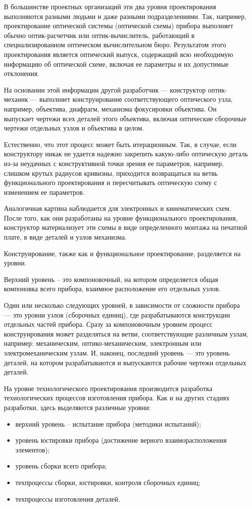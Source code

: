 В большинстве проектных организаций эти два уровня проектирования выполняются разными людьми и даже разными подразделениями. 
Так, например, проектирование оптической системы (оптической схемы) прибора выполняет обычно оптик-расчетчик или оптик-вычислитель, работающий в специализированном оптическом вычислительном бюро. 
Результатом этого проектирования является оптический выпуск, содержащий всю необходимую информацию об оптической схеме, включая ее параметры и их допустимые отклонения. 

На основании этой информации другой разработчик --- конструктор оптик-механик --- выполняет конструирование соответствующего оптического узла, например, объектива, диафрагм, механизма фокусировки объектива. 
Он выпускает чертежи всех деталей этого объектива, включая оптические сборочные чертежи отдельных узлов и объектива в целом.

Естественно, что этот процесс может быть итерационным. 
Так, в случае, если конструктору никак не удается надежно закрепить какую-либо оптическую деталь из-за неудачных с конструктивной точки зрения ее параметров, например, слишком крутых радиусов кривизны, приходится возвращаться на ветвь функционального проектирования и пересчитывать оптическую схему с изменением ее параметров.

Аналогичная картина наблюдается для электронных и кинематических схем. 
После того, как они разработаны на уровне функционального проектирования, конструктор материализует эти схемы в виде определенного монтажа на печатной плате, в виде деталей и узлов механизма.

Конструирование, также как и функциональное проектирование, разделяется на уровни.

Верхний уровень -- это компоновочный, на котором определяется общая компоновка всего прибора, взаимное расположение его отдельных узлов.

Один или несколько следующих уровней, в зависимости от сложности прибора --- это уровни узлов (сборочных единиц), где разрабатываются конструкции отдельных частей прибора. Сразу за компоновочным уровнем процесс конструирования может разделяться на ветви, соответствующие различным узлам, например: механическим, оптико-механическим, электронным или электромеханическим узлам. 
И, наконец, последний уровень --- это уровень деталей, на котором разрабатываются и выпускаются рабочие чертежи отдельных деталей.

На уровне технологического проектирования производится разработка технологических процессов изготовления прибора. 
Как и на других стадиях разработки, здесь выделяются различные уровни:
\begin{itemize}
	\item верхний уровень -- испытание прибора (методики испытаний);
	\item уровень юстировки прибора (достижение верного взаиморасположения элементов);
	\item уровень сборки всего прибора;
	\item техпроцессы сборки, юстировки, контроля сборочных единиц;
	\item техпроцессы изготовления деталей. 
\end{itemize}

